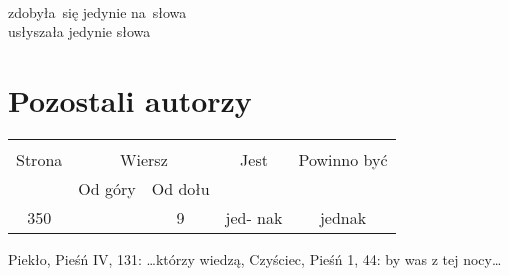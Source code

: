 \documentclass[a4paper,11pt]{article}
\begin{document}
\noi
{} \\
\Jest  zdobyła~się jedynie na~słowa \\
\Powin usłyszała jedynie słowa \\

\vspace{\spaceTwo}










\newpage
\section{Pozostali autorzy}

\vspace{\spaceTwo}






\begin{center}
  \begin{tabular}{|c|c|c|c|c|}
    \hline
    & \multicolumn{2}{c|}{} & & \\
    Strona & \multicolumn{2}{c|}{Wiersz} & Jest
                              & Powinno być \\ \cline{2-3}
    & Od góry & Od dołu & & \\
    \hline
    350 & & 9 & jed- nak & jednak \\
    \hline
  \end{tabular}
\end{center}


Piekło, Pieśń IV, 131: \ldots którzy wiedzą, Czyściec, Pieśń 1, 44: by was
z tej nocy\ldots

\vspace{\spaceTwo}




\end{document}
